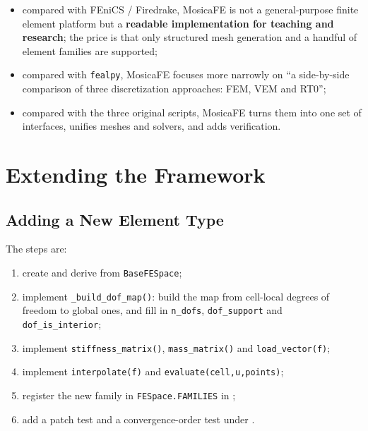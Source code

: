 \documentclass[11pt,oneside]{book}
\theoremstyle{definition}
\theoremstyle{plain}
\newcommand{\mosica}{\textsf{MosicaFE}}
\newcommand{\code}[1]{\texttt{#1}}
\begin{document}
\begin{itemize}[itemsep=0.2em]
  \item compared with FEniCS / Firedrake, \mosica{} is not a general-purpose finite
        element platform but a \textbf{readable implementation for teaching and
        research}; the price is that only structured mesh generation and a handful of
        element families are supported;
  \item compared with \code{fealpy}, \mosica{} focuses more narrowly on ``a
        side-by-side comparison of three discretization approaches: FEM, VEM and
        RT0'';
  \item compared with the three original scripts, \mosica{} turns them into one set
        of interfaces, unifies meshes and solvers, and adds verification.
\end{itemize}

\chapter{Extending the Framework}
\label{chap:extend}

\section{Adding a New Element Type}

The steps are:

\begin{enumerate}[label=(\arabic*),itemsep=0.2em]
  \item create  and derive from
        \code{BaseFESpace};
  \item implement \code{\_\allowbreak build\_\allowbreak dof\_\allowbreak map()}: build the map from cell-local degrees
        of freedom to global ones, and fill in \code{n\_\allowbreak dofs}, \code{dof\_\allowbreak support} and
        \code{dof\_\allowbreak is\_\allowbreak interior};
  \item implement \code{stiffness\_\allowbreak matrix()}, \code{mass\_\allowbreak matrix()} and
        \code{load\_\allowbreak vector(f)};
  \item implement \code{interpolate(f)} and \code{evaluate(cell,\allowbreak  u,\allowbreak  points)};
  \item register the new family in \code{FESpace.FAMILIES} in
        ;
  \item add a patch test and a convergence-order test under .
\end{enumerate}
\end{document}
